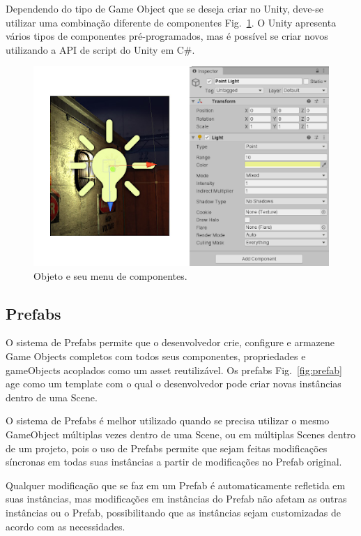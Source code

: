 Dependendo do tipo de Game Object que se deseja criar no Unity, deve-se utilizar uma combinação diferente de componentes Fig.~\ref{fig:objprop}. O Unity apresenta vários tipos de componentes pré-programados, mas é possível se criar novos utilizando a API de script do Unity em C\#.
\begin{figure}
  \includegraphics[width=\linewidth, scale = 0.2]{objprop.jpg}
  \caption{Objeto e seu menu de componentes.}
  \label{fig:objprop}
\end{figure}
\pagebreak
\subsection{Prefabs}

O sistema de Prefabs permite que o desenvolvedor crie, configure e armazene Game Objects completos com todos seus componentes, propriedades e gameObjects acoplados como um asset reutilizável. Os prefabs Fig.~\ref{fig:prefab} age como um template com o qual o desenvolvedor pode criar novas instâncias dentro de uma Scene.

	O sistema de Prefabs é melhor utilizado quando se precisa utilizar o mesmo GameObject múltiplas vezes dentro de uma Scene, ou em múltiplas Scenes dentro de um projeto, pois o uso de Prefabs permite que sejam feitas modificações síncronas em todas suas instâncias a partir de modificações no Prefab original.
	
	Qualquer modificação que se faz em um Prefab é automaticamente refletida em suas instâncias, mas modificações em instâncias do Prefab não afetam as outras instâncias ou o Prefab, possibilitando que as instâncias sejam customizadas de acordo com as necessidades.
	
